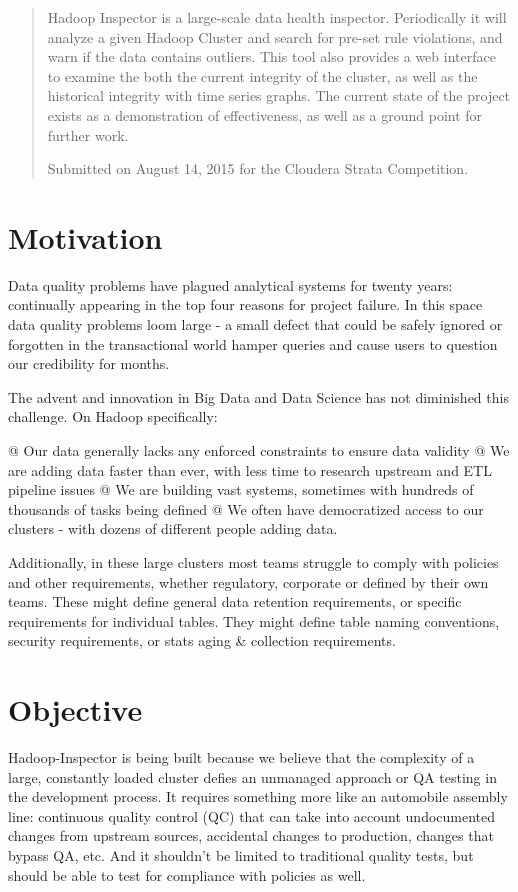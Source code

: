 \begin{abstract}
Hadoop Inspector is a large-scale data health inspector. Periodically it will analyze a given Hadoop Cluster and search
for pre-set rule violations, and warn if the data contains outliers. This tool also provides a web interface to examine
the both the current integrity of the cluster, as well as the historical integrity with time series graphs. The current
state of the project exists as a demonstration of effectiveness, as well as a ground point for further work.

Submitted on August 14, 2015 for the Cloudera Strata Competition.
\end{abstract}

\section{Motivation}
Data quality problems have plagued analytical systems for twenty years: continually appearing in the top four reasons
for project failure. In this space data quality problems loom large - a small defect that could be safely ignored or
forgotten in the transactional world hamper queries and cause users to question our credibility for months.

The advent and innovation in Big Data and Data Science has not diminished this challenge. On Hadoop specifically:

\begin{easylist}[itemize]
    @ Our data generally lacks any enforced constraints to ensure data validity
    @ We are adding data faster than ever, with less time to research upstream and ETL pipeline issues
    @ We are building vast systems, sometimes with hundreds of thousands of tasks being defined
    @ We often have democratized access to our clusters - with dozens of different people adding data.
\end{easylist}

Additionally, in these large clusters most teams struggle to comply with policies and other requirements, whether
regulatory, corporate or defined by their own teams. These might define general data retention requirements, or specific
requirements for individual tables. They might define table naming conventions, security requirements, or stats aging \&
collection requirements.


\section{Objective}
Hadoop-Inspector is being built because we believe that the complexity of a large, constantly loaded cluster defies an
unmanaged approach or QA testing in the development process. It requires something more like an automobile assembly
line: continuous quality control (QC) that can take into account undocumented changes from upstream sources, accidental
changes to production, changes that bypass QA, etc. And it shouldn't be limited to traditional quality tests, but should
be able to test for compliance with policies as well.


